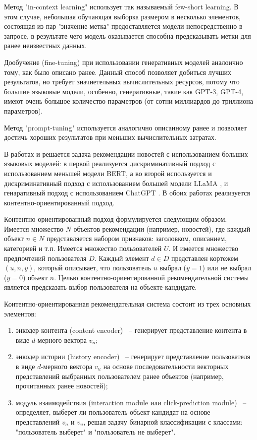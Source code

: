 Метод "in-context learning" использует так называемый few-short learning. В этом случае, небольшая обучающая выборка размером в несколько элементов, состоящая из пар "значение-метка" предоставляется модели непосредственно в запросе, в результате чего модель оказывается способна предсказывать метки для ранее неизвестных данных.

Дообучение (fine-tuning) при использовании генеративных моделей аналоично тому, как было описано ранее. Данный способ позволяет добиться лучших результатов, но требует значиетельных вычислительных ресурсов, потому что большие языковые модели, особенно, генеративные, такие как GPT-3, GPT-4, имеют очень большое количество параметров (от сотни миллиардов до триллиона параметров).

Метод "prompt-tuning" используется аналогично описанному ранее и позволяет достичь хороших результатов при меньших вычислительных затратах.


В работах \cite{news_rec_bert} и \cite{news_rec_gen} решается задача рекомендации новостей с использованием больших языковых моделей: в первой реализуется дискриминативный подход с использованием меньшей модели BERT, а во второй используется и дискриминативный подход с использованием большей модели LLaMA \cite{llama}, и генаративный подход с использованием ChatGPT \cite{chatgpt}. В обоих работах реализуется контентно-ориентированный подход.

Контентно-ориентированный подход формулируется следующим образом. Имеется множество $N$ объектов рекомендации (например, новостей), где каждый объект $n \in N$ представляется набором признаков: заголовком, описанием, категорией и т.п. Имеется множество пользователей $U$. И имеется множество предпочтений пользователя $D$. Каждый элемент $d \in D$ представлен кортежем $(u, n, y)$, который описывает, что пользователь $u$ выбрал ($y = 1$) или не выбрал ($y = 0$) объект $n$. Целью контентно-ориентированной рекомендательной системы является предсказать выбор пользователя на объекте-кандидате.

Контентно-ориентированная рекомендательная система состоит из трех основных элементов:
\begin{enumerate}
    \item энкодер контента (content encoder) ~-- генерирует представление контента в виде $d$-мерного вектора $v_n$;
    \item энкодер истории (history encoder) ~-- генерирует представление пользователя в виде $d$-мерного вектора $v_u$ на основе последовательности векторных представлений выбранных пользователем ранее объектов (например, прочитанных ранее новостей);
    \item модуль взаимодействия (interaction module или click-prediction module) ~-- определяет, выберет ли пользователь объект-кандидат на основе представлений $v_n$ и $v_u$, решая задачу бинарной классификации с классами: "пользователь выберет" и "пользователь не выберет".
\end{enumerate}

